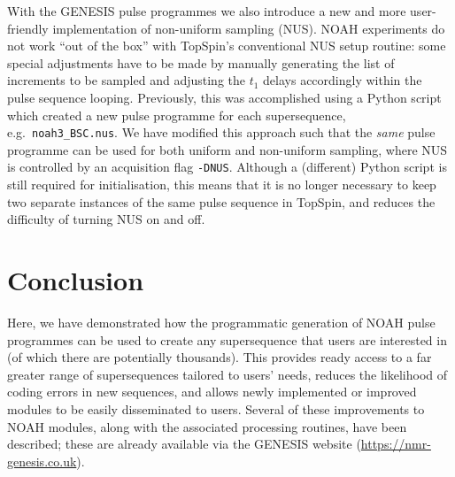 \documentclass[a4paper,11pt]{article}
\newcommand{\theurl}{\url{https://nmr-genesis.co.uk}}
\begin{document}
\begin{refsection}
With the GENESIS pulse programmes we also introduce a new and more user-friendly implementation of non-uniform sampling (NUS).
NOAH experiments do not work ``out of the box'' with TopSpin's conventional NUS setup routine: some special adjustments have to be made by manually generating the list of increments to be sampled and adjusting the \(t_1\) delays accordingly within the pulse sequence looping.
Previously, this was accomplished using a Python script which created a new pulse programme for each supersequence, e.g.\ \texttt{noah3\_BSC.nus}.\autocite{Claridge2019MRC}
We have modified this approach such that the \textit{same} pulse programme can be used for both uniform and non-uniform sampling, where NUS is controlled by an acquisition flag \texttt{-DNUS}.
Although a (different) Python script is still required for initialisation, this means that it is no longer necessary to keep two separate instances of the same pulse sequence in TopSpin, and reduces the difficulty of turning NUS on and off.


\section{Conclusion}

Here, we have demonstrated how the programmatic generation of NOAH pulse programmes can be used to create any supersequence that users are interested in (of which there are potentially thousands).
This provides ready access to a far greater range of supersequences tailored to users' needs, reduces the likelihood of coding errors in new sequences, and allows newly implemented or improved modules to be easily disseminated to users.
Several of these improvements to NOAH modules, along with the associated processing routines, have been described; these are already available via the GENESIS website (\theurl{}).


\printbibliography{}
\end{refsection}
\end{document}
